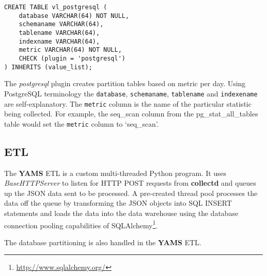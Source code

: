 \documentclass[a4paper,twoside,12pt]{article}
\begin{document}
\lstset{language=sql}
\begin{lstlisting}
CREATE TABLE vl_postgresql (
    database VARCHAR(64) NOT NULL,
    schemaname VARCHAR(64),
    tablename VARCHAR(64),
    indexname VARCHAR(64),
    metric VARCHAR(64) NOT NULL,
    CHECK (plugin = 'postgresql')
) INHERITS (value_list);
\end{lstlisting}

The \textit{postgresql} plugin creates partition tables based on metric per
day.  Using PostgreSQL terminology the \texttt{database}, \texttt{schemaname},
\texttt{tablename} and \texttt{indexename} are self-explanatory.  The
\texttt{metric} column is the name of the particular statistic being collected.
For example, the seq\_scan column from the pg\_stat\_all\_tables table would
set the \texttt{metric} column to `seq\_scan'.

\subsection{ETL}

The \textbf{YAMS} ETL is a custom multi-threaded Python program.  It uses
\textit{BaseHTTPServer} to listen for HTTP POST requests from
\textbf{collectd} and queues up the JSON data sent to be processed.  A
pre-created thread pool processes the data off the queue by transforming the
JSON objects into SQL INSERT statements and loads the data into the data
warehouse using the database connection pooling capabilities of
SQLAlchemy\footnote{\url{http://www.sqlalchemy.org/}}.

The database partitioning is also handled in the \textbf{YAMS} ETL.
\end{document}
